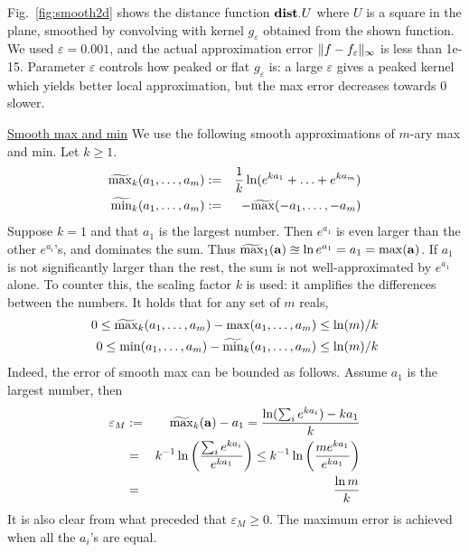 Fig.~\ref{fig:smooth2d} shows the distance function $\mathbf{dist}_{\cdot}{U}$ where $U$ is a square in the plane, smoothed by convolving with kernel $g_{\varepsilon}$ obtained from the shown function. 
We used $\varepsilon = 0.001$, and the actual approximation error $\|f-f_\varepsilon\|_\infty$ is less than 1e-15.
Parameter $\varepsilon$ controls how peaked or flat $g_\varepsilon$ is: a large $\varepsilon$ gives a peaked kernel which yields better local approximation, but the max error decreases towards 0 slower.

\underline{Smooth max and min}
We use the following smooth approximations of $m$-ary max and min.
Let $k \geq 1$.
\begin{eqnarray}
	\label{eq:soft max min}
	\widetilde{\max}_k(a_1,\ldots,a_m) &:=& \frac{1}{k} \ln(e^{ka_1}+\ldots+e^{ka_m})
	\\
	\widetilde{\min}_k(a_1,\ldots,a_m) &:=& -\widetilde{\max}(-a_1,\ldots,-a_m)
\end{eqnarray}
Suppose $k=1$ and that $a_1$ is the largest number.
Then $e^{a_1}$ is even larger than the other $e^{a_i}$'s, and dominates the sum. 
Thus $\widetilde{\max}_1(\mathbf{a}) \approxeq \ln e^{a_1} = a_1 = \max(\mathbf{a})$.
If $a_1$ is not significantly larger than the rest, the sum is not well-approximated by $e^{a_1}$ alone.
To counter this, the scaling factor $k$ is used: it amplifies the differences between the numbers.
It holds that for any set of $m$ reals,
\begin{eqnarray}
\label{eq:smooth max error}
0 \leq \widetilde{\max}_k(a_1,\ldots,a_m) -\max(a_1,\ldots,a_m) \leq \ln(m)/k
\\
0 \leq \min(a_1,\ldots,a_m) -\widetilde{\min}_k(a_1,\ldots,a_m) \leq \ln(m)/k
\end{eqnarray}
Indeed, the error of smooth max can be bounded as follows.
Assume $a_1$ is the largest number, then 
\begin{eqnarray*}
\varepsilon_M &:=& \widetilde{\max}_k(\mathbf{a}) - a_1 =  \frac{\ln(\sum_ie^{ka_i})-ka_1}{k}
\\
&=& k^{-1}\ln\left(\frac{\sum_ie^{ka_i}}{e^{ka_1}}\right) \leq k^{-1}\ln \left(\frac{me^{ka_1}}{e^{ka_1}}\right)
\\
&=&\frac{\ln m}{k}
\end{eqnarray*}
It is also clear from what preceded that $\varepsilon_M \geq 0$.
The maximum error is achieved when all the $a_i$'s are equal.